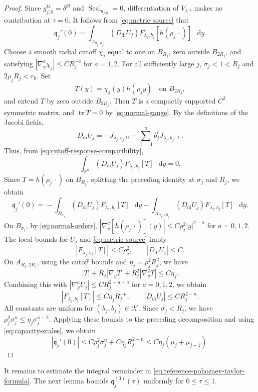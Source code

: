 \documentclass[11pt]{article}
\numberwithin{equation}{section}
\theoremstyle{remark}
\newcommand{\R}{\mathbb R}
\newcommand{\dd}{\mathop{}\!\mathrm{d}}
\DeclareMathOperator{\tr}{tr}
\begin{document}
\begin{proof}
Since \(g_{j,0}^{kl}=\delta^{kl}\) and \(\operatorname{Scal}_{g_{j,0}}=0\), differentiation of
\(V_{j,\tau}\) makes no contribution at \(\tau=0\).
{It follows from \eqref{eq:metric-source} that}
\[
 \mathfrak q_j'(0)
 =\int_{A_{\sigma_j,R_j}}
 \left(D_{\mathrm{di}}U_j\right)
 F_{\lambda_j,b_j}[h(\rho_j\,\cdot)]\,\dd y.
\]
Choose a smooth radial cutoff \(\chi_j\) equal to one on \(B_{R_j}\), zero
outside \(B_{2R_j}\), and satisfying
\(|\nabla_y^a\chi_j|\le CR_j^{-a}\) for \(a=1,2\).
For all sufficiently large \(j\), \(\sigma_j<1<R_j\) and
\(2\rho_jR_j<r_0\). Set
\[
 T(y)=\chi_j(y)h(\rho_jy)\quad\text{on }B_{2R_j},
\]
and extend \(T\) by zero outside \(B_{2R_j}\).
Then \(T\) is a compactly supported \(C^2\) symmetric matrix, and
\(\tr T=0\) by \eqref{eq:normal-gauge}.
{By the definitions of the Jacobi fields,}
\[
 D_{\mathrm{di}}U_j
 =-J_{\lambda_j,b_j,0}
  -\sum_{\ell=1}^n b_j^\ell J_{\lambda_j,b_j,\ell}.
\]
{Thus, from \eqref{eq:cutoff-response-compatibility},}
\[
 \int_{\R^n}
 \left(D_{\mathrm{di}}U_j\right)
 F_{\lambda_j,b_j}[T]\,\dd y=0.
\]
{Since \(T=h(\rho_j\,\cdot)\) on \(B_{R_j}\), splitting
the preceding identity at \(\sigma_j\) and \(R_j\), we obtain}
 {
\[
 \mathfrak q_j'(0)
 ={}-\int_{B_{\sigma_j}}
 \left(D_{\mathrm{di}}U_j\right)
 F_{\lambda_j,b_j}[T]\,\dd y
 -\int_{A_{R_j,2R_j}}
 \left(D_{\mathrm{di}}U_j\right)
 F_{\lambda_j,b_j}[T]\,\dd y.
\]
}
{On \(B_{\sigma_j}\), by \eqref{eq:normal-orders},}
\(|\nabla_y^a[h(\rho_j\,\cdot)](y)|
\le C\rho_j^2|y|^{2-a}\) for \(a=0,1,2\).
The local bounds for \(U_j\) and \eqref{eq:metric-source} imply
\[
 |F_{\lambda_j,b_j}[T]|\le C\rho_j^2,
 \qquad
 \left|D_{\mathrm{di}}U_j\right|\le C.
\]
{On \(A_{R_j,2R_j}\), using the cutoff bounds and
\(\eta_j=\rho_j^2R_j^2\), we have}
\[
 |T|+R_j|\nabla_yT|+R_j^2|\nabla_y^2T|\le C\eta_j.
\]
Combining this with
\(|\nabla_y^aU_j|\le CR_j^{2-n-a}\) for \(a=0,1,2\), we obtain
\[
 |F_{\lambda_j,b_j}[T]|\le C\eta_jR_j^{-n},
 \qquad
 \left|D_{\mathrm{di}}U_j\right|
 \le CR_j^{2-n}.
\]
All constants are uniform for \((\lambda_j,b_j)\in\mathcal K\).
Since \(\sigma_j<R_j\), we have
\(\rho_j^2\sigma_j^n\le\eta_j\sigma_j^{n-2}\).
Applying these bounds to the preceding decomposition and using
\eqref{eq:capacity-scales}, we obtain
\[
 |\mathfrak q_j'(0)|
 \le C\rho_j^2\sigma_j^n+C\eta_jR_j^{2-n}
 \le C\eta_j(\mu_j+\mu_{j-1}).
\]
\end{proof}

It remains to estimate the integral remainder in
\eqref{eq:reference-pohozaev-taylor-formula}. The next lemma bounds
\(\mathfrak q_j^{(3)}(\tau)\) uniformly for \(0\le\tau\le1\).
\end{document}

